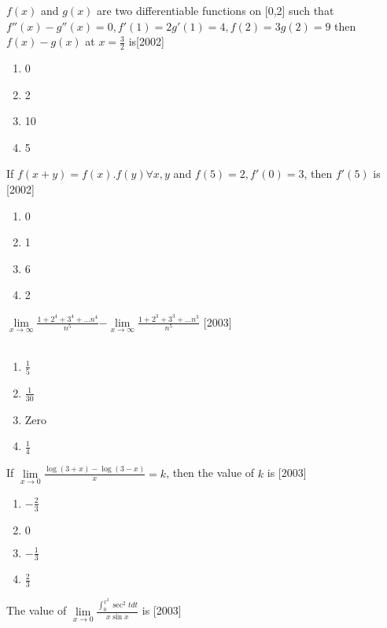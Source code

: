 \item $f(x)$ and $g(x)$ are two differentiable functions on [0,2] such that $f''(x)-g''(x)=0, f'(1)=2g'(1)=4,f(2)=3g(2)=9$ then $f(x)-g(x)$ at $x=\frac{3}{2}$ is\hfill{[2002]}\\
\begin{enumerate}
    \item{0}
    \item{2}
    \item{10}
    \item{5}\\[2pt]
\end{enumerate}
\item If $f(x+y)=f(x).f(y)\forall x,y$ and $f(5)=2,f'(0)=3$, then $f'(5)$ is \hfill [2002]\\
\begin{enumerate}
	\item{0}
	\item{1}
	\item{6}
	\item{2}\\[2pt]
\end{enumerate}
\item $\displaystyle\lim\limits_{x\to\infty}\frac{1+2^4+3^4+\dots n^4}{n^5}$$-$$\displaystyle\lim\limits_{x\to\infty}\frac{1+2^3+3^3+\dots n^3}{n^5}$ \hfill{[2003]}\\\
\begin{enumerate}
    \item{$\frac{1}{5}$}
    \item{$\frac{1}{30}$}
    \item{Zero}
    \item{$\frac{1}{4}$}\\[2pt]
\end{enumerate}
\item If $\displaystyle \lim\limits_{x\to 0}\frac{\log(3+x)-\log(3-x)}{x} = k$, then the value of $k$ is \hfill{[2003]}\\
\begin{enumerate}
    \item{$-\frac{2}{3}$}
    \item{$0$}
    \item{$-\frac{1}{3}$}
    \item{$\frac{2}{3}$}\\[2pt]
\end{enumerate}
\item The value of $\displaystyle \lim\limits_{x\to 0}\frac{\int_{0}^{x^2} \sec^2tdt}{x\sin x}$ is \hfill [2003]\\
